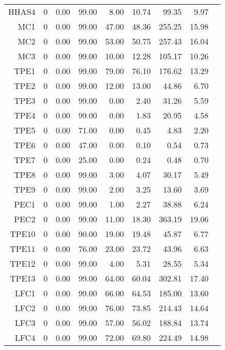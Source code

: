 \begin{longtable}{|rrrrrrrrr|}
	HHAS4  &  0  &  0.00  &  99.00  &  8.00  &  10.74  &  99.35  &  9.97 & \\
	MC1  &  0  &  0.00  &  99.00  &  47.00  &  48.36  &  255.25  &  15.98 & \\
	MC2  &  0  &  0.00  &  99.00  &  53.00  &  50.75  &  257.43  &  16.04 & \\
	MC3  &  0  &  0.00  &  99.00  &  10.00  &  12.28  &  105.17  &  10.26 & \\
	TPE1  &  0  &  0.00  &  99.00  &  79.00  &  76.10  &  176.62  &  13.29 & \\
	TPE2  &  0  &  0.00  &  99.00  &  12.00  &  13.00  &  44.86  &  6.70 & \\
	TPE3  &  0  &  0.00  &  99.00  &  0.00  &  2.40  &  31.26  &  5.59 & \\
	TPE4  &  0  &  0.00  &  99.00  &  0.00  &  1.83  &  20.95  &  4.58 & \\
	TPE5  &  0  &  0.00  &  71.00  &  0.00  &  0.45  &  4.83  &  2.20 & \\
	TPE6  &  0  &  0.00  &  47.00  &  0.00  &  0.10  &  0.54  &  0.73 & \\
	TPE7  &  0  &  0.00  &  25.00  &  0.00  &  0.24  &  0.48  &  0.70 & \\
	TPE8  &  0  &  0.00  &  99.00  &  3.00  &  4.07  &  30.17  &  5.49 & \\
	TPE9  &  0  &  0.00  &  99.00  &  2.00  &  3.25  &  13.60  &  3.69 & \\
	PEC1  &  0  &  0.00  &  99.00  &  1.00  &  2.27  &  38.88  &  6.24 & \\
	PEC2  &  0  &  0.00  &  99.00  &  11.00  &  18.30  &  363.19  &  19.06 & \\
	TPE10  &  0  &  0.00  &  90.00  &  19.00  &  19.48  &  45.87  &  6.77 & \\
	TPE11  &  0  &  0.00  &  76.00  &  23.00  &  23.72  &  43.96  &  6.63 & \\
	TPE12  &  0  &  0.00  &  99.00  &  4.00  &  5.31  &  28.55  &  5.34 & \\
	TPE13  &  0  &  0.00  &  99.00  &  64.00  &  60.04  &  302.81  &  17.40 & \\
	LFC1  &  0  &  0.00  &  99.00  &  66.00  &  64.53  &  185.00  &  13.60 & \\
	LFC2  &  0  &  0.00  &  99.00  &  76.00  &  73.85  &  214.43  &  14.64 & \\
	LFC3  &  0  &  0.00  &  99.00  &  57.00  &  56.02  &  188.84  &  13.74 & \\
	LFC4  &  0  &  0.00  &  99.00  &  72.00  &  69.80  &  224.49  &  14.98 & \\

\end{longtable}
